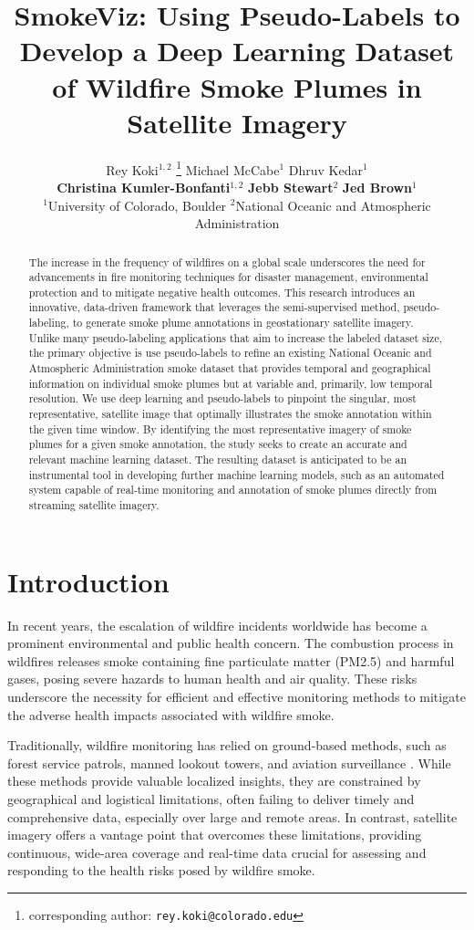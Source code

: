 \documentclass{article}
\title{SmokeViz: Using Pseudo-Labels to Develop a Deep Learning Dataset of Wildfire Smoke Plumes in Satellite Imagery}
\author{%
    Rey Koki\(^{1,2}\)  \thanks{corresponding author: \texttt{rey.koki@colorado.edu} } \quad Michael McCabe\(^{1}\) \quad Dhruv Kedar\(^{1}\)\\ 
    \textbf{Christina Kumler-Bonfanti}\(^{1,2}\) \quad \textbf{Jebb Stewart}\(^{2}\) \quad  \textbf{Jed Brown}\(^{1}\) \\
    \(^1\)University of Colorado, Boulder \quad \(^2\)National Oceanic and Atmospheric Administration\\
}
\begin{document}
\maketitle


\begin{abstract}
The increase in the frequency of wildfires on a global scale underscores the need for advancements in fire monitoring techniques for disaster management, environmental protection and to mitigate negative health outcomes. This research introduces an innovative, data-driven framework that leverages the semi-supervised method, pseudo-labeling, to generate smoke plume annotations in geostationary satellite imagery. Unlike many pseudo-labeling applications that aim to increase the labeled dataset size, the primary objective is use pseudo-labels to refine an existing National Oceanic and Atmospheric Administration smoke dataset that provides temporal and geographical information on individual smoke plumes but at variable and, primarily, low temporal resolution. We use deep learning and pseudo-labels to pinpoint the singular, most representative, satellite image that optimally illustrates the smoke annotation within the given time window. By identifying the most representative imagery of smoke plumes for a given smoke annotation, the study seeks to create an accurate and relevant machine learning dataset. The resulting dataset is anticipated to be an instrumental tool in developing further machine learning models, such as an automated system capable of real-time monitoring and annotation of smoke plumes directly from streaming satellite imagery.
\end{abstract}


\section{Introduction}

In recent years, the escalation of wildfire incidents worldwide has become a prominent environmental and public health concern. The combustion process in wildfires releases smoke containing fine particulate matter (PM2.5) and harmful gases, posing severe hazards to human health and air quality. These risks underscore the necessity for efficient and effective monitoring methods to mitigate the adverse health impacts associated with wildfire smoke. 

Traditionally, wildfire monitoring has relied on ground-based methods, such as forest service patrols, manned lookout towers, and aviation surveillance \cite{smoke_monitoring}. While these methods provide valuable localized insights, they are constrained by geographical and logistical limitations, often failing to deliver timely and comprehensive data, especially over large and remote areas. In contrast, satellite imagery offers a vantage point that overcomes these limitations, providing continuous, wide-area coverage and real-time data crucial for assessing and responding to the health risks posed by wildfire smoke.
\end{document}
